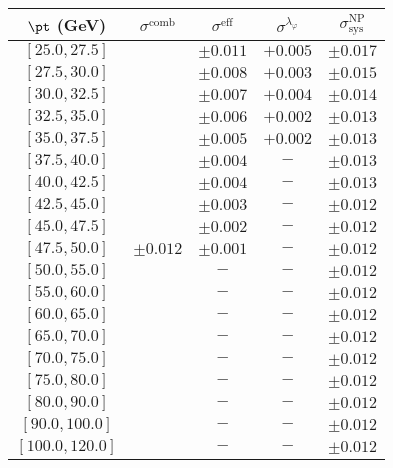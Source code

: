 \begin{tabular}{c||c|c|c||c}
$\pt$ (GeV) & $\sigma^{\text{comb}}$ & $\sigma^{\text{eff}}$ & $\sigma^{\lambda_\varphi}$ & $\sigma_{\text{sys}}^{\text{NP}}$ \\
\hline
$[25.0, 27.5]$ & \multirow{19}{*}{$\pm0.012$} & $\pm0.011$ & $+0.005$ & $\pm0.017$\\
$[27.5, 30.0]$ &  & $\pm0.008$ & $+0.003$ & $\pm0.015$\\
$[30.0, 32.5]$ &  & $\pm0.007$ & $+0.004$ & $\pm0.014$\\
$[32.5, 35.0]$ &  & $\pm0.006$ & $+0.002$ & $\pm0.013$\\
$[35.0, 37.5]$ &  & $\pm0.005$ & $+0.002$ & $\pm0.013$\\
$[37.5, 40.0]$ &  & $\pm0.004$ & $-$ & $\pm0.013$\\
$[40.0, 42.5]$ &  & $\pm0.004$ & $-$ & $\pm0.013$\\
$[42.5, 45.0]$ &  & $\pm0.003$ & $-$ & $\pm0.012$\\
$[45.0, 47.5]$ &  & $\pm0.002$ & $-$ & $\pm0.012$\\
$[47.5, 50.0]$ &  & $\pm0.001$ & $-$ & $\pm0.012$\\
$[50.0, 55.0]$ &  & $-$ & $-$ & $\pm0.012$\\
$[55.0, 60.0]$ &  & $-$ & $-$ & $\pm0.012$\\
$[60.0, 65.0]$ &  & $-$ & $-$ & $\pm0.012$\\
$[65.0, 70.0]$ &  & $-$ & $-$ & $\pm0.012$\\
$[70.0, 75.0]$ &  & $-$ & $-$ & $\pm0.012$\\
$[75.0, 80.0]$ &  & $-$ & $-$ & $\pm0.012$\\
$[80.0, 90.0]$ &  & $-$ & $-$ & $\pm0.012$\\
$[90.0, 100.0]$ &  & $-$ & $-$ & $\pm0.012$\\
$[100.0, 120.0]$ &  & $-$ & $-$ & $\pm0.012$\\
\end{tabular}
